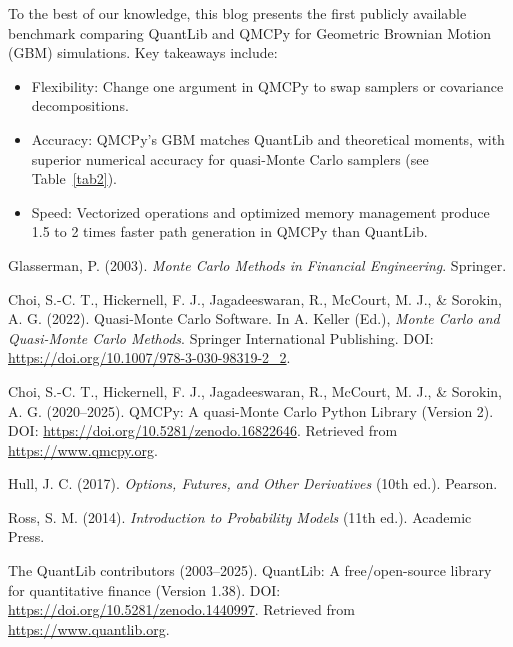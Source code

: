 \documentclass{article}
\begin{document}
\bigskip
\begin{tcolorbox}[title=Takeaways,colback=blue!1,colframe=blue!30!black]
To the best of our knowledge, this blog presents the first publicly available benchmark comparing QuantLib and QMCPy for Geometric Brownian Motion (GBM) simulations. Key takeaways include:
\begin{itemize}%
    \item Flexibility: Change one argument in QMCPy to swap samplers or covariance decompositions.
    \item Accuracy: QMCPy's GBM matches QuantLib and theoretical moments, with superior numerical accuracy for quasi-Monte Carlo samplers (see Table~\ref{tab2}).
    \item Speed: Vectorized operations and optimized memory management produce 1.5 to 2 times faster path generation in QMCPy than QuantLib.
\end{itemize}
\end{tcolorbox}


\begin{thebibliography}{6}

Glasserman, P. (2003). \textit{Monte Carlo Methods in Financial Engineering}. Springer.

Choi, S.-C. T., Hickernell, F. J., Jagadeeswaran, R., McCourt, M. J., \& Sorokin, A. G. (2022).
Quasi-Monte Carlo Software. In A. Keller (Ed.), \textit{Monte Carlo and Quasi-Monte Carlo Methods}.
Springer International Publishing. DOI: \url{https://doi.org/10.1007/978-3-030-98319-2_2}.

Choi, S.-C. T., Hickernell, F. J., Jagadeeswaran, R., McCourt, M. J., \& Sorokin, A. G. (2020--2025).
QMCPy: A quasi-Monte Carlo Python Library (Version 2).
DOI: \url{https://doi.org/10.5281/zenodo.16822646}. 
Retrieved from \url{https://www.qmcpy.org}.

Hull, J. C. (2017). \textit{Options, Futures, and Other Derivatives} (10th ed.). Pearson.

Ross, S. M. (2014). \textit{Introduction to Probability Models} (11th ed.). Academic Press.

The QuantLib contributors (2003--2025). 
QuantLib: A free/open-source library for quantitative finance (Version 1.38).
DOI: \url{https://doi.org/10.5281/zenodo.1440997}. 
Retrieved from \url{https://www.quantlib.org}.
\end{thebibliography}
\end{document}
